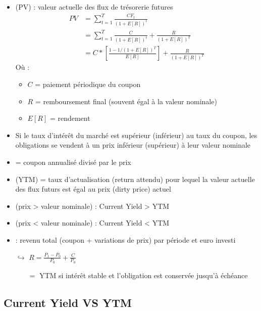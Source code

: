 \begin{itemize}
    \item {} (PV) : valeur actuelle des flux de trésorerie futures
    \begin{align*}
        PV &= \sum_{t = 1}^T \frac{CF_t}{(1+E[R])^t}\\
           &= \sum_{t=1}^T \frac{C}{(1+E[R])^t} + \frac{R}{(1 + E[R])^T}\\
           &= C * \left[ \frac{1 - 1/(1+E[R])^T}{E[R]} \right] + \frac{R}{(1 + E[R])^T}
    \end{align*}
    Où :
    \begin{itemize}
        \item $C$ = paiement périodique du coupon
        \item $R$ = remboursement final (souvent égal à la valeur nominale)
        \item $E[R]$ = rendement
    \end{itemize}
    \item Si le taux d'intérêt du marché est supérieur (inférieur) au taux du coupon, les obligations se vendent à un prix inférieur (supérieur) à leur valeur nominale
    \item {} = coupon annualisé divisé par le prix
    \item {} (YTM) = taux d'actualisation (return attendu) pour lequel la valeur actuelle des flux futurs est égal au prix (dirty price) actuel
    \item {} (prix > valeur nominale) : Current Yield > YTM
    \item {} (prix < valeur nominale) : Current Yield < YTM
    \item {} : revenu total (coupon + variations de prix) par période et euro investi
    \item[$\hookrightarrow$] $R = \frac{P_1 - P_0}{P_0} + \frac{C}{P_0}$
    \begin{itemize}
        \item[$=$] YTM si intérêt stable et l'obligation est conservée jusqu'à échéance
    \end{itemize}
\end{itemize}

\subsection{Current Yield VS YTM}

